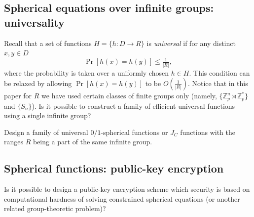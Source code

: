 \documentclass{jgcc}
\def\MZ{{\mathbb{Z}}}
\begin{document}
\subsection{Spherical equations over infinite groups: universality}

Recall that a set of functions $H=\{h\colon D\to R\}$ is \emph{universal} if 
for any distinct $x,y\in D$ 
$$
\Pr[h(x)=h(y)] \le \tfrac{1}{|R|},
$$
where the probability is taken over a uniformly chosen $h\in H$.
This condition can be relaxed by allowing
$\Pr[h(x)=h(y)]$ to be $O(\tfrac{1}{|R|})$.
Notice that in this paper 
for $R$ we have used certain classes of finite groups only
(namely, $\{\MZ_p^n \rtimes \MZ_p^\ast\}$ and $\{S_n\}$).
Is it possible to construct a family of efficient universal functions
using a single infinite group?

\begin{prob}
Design a family of universal 
$0/1$-spherical functions or $J_C$ functions with the ranges 
$R$ being a part of the same infinite group.
\end{prob}


\subsection{Spherical functions: public-key encryption}


\begin{prob}
Is it possible to design a public-key encryption scheme which security
is based on computational hardness of solving constrained spherical equations
(or another related group-theoretic problem)?
\end{prob}



\end{document}
